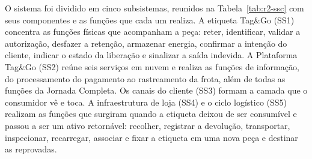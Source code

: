 O sistema foi dividido em cinco subsistemas, reunidos na Tabela~\ref{tab:r2-ssc} com seus componentes e as funções que cada um realiza. A etiqueta Tag\&Go (SS1) concentra as funções físicas que acompanham a peça: reter, identificar, validar a autorização, desfazer a retenção, armazenar energia, confirmar a intenção do cliente, indicar o estado da liberação e sinalizar a saída indevida. A Plataforma Tag\&Go (SS2) reúne seis serviços em nuvem e realiza as funções de informação, do processamento do pagamento ao rastreamento da frota, além de todas as funções da Jornada Completa. Os canais do cliente (SS3) formam a camada que o consumidor vê e toca. A infraestrutura de loja (SS4) e o ciclo logístico (SS5) realizam as funções que surgiram quando a etiqueta deixou de ser consumível e passou a ser um ativo retornável: recolher, registrar a devolução, transportar, inspecionar, recarregar, associar e fixar a etiqueta em uma nova peça e destinar as reprovadas.

